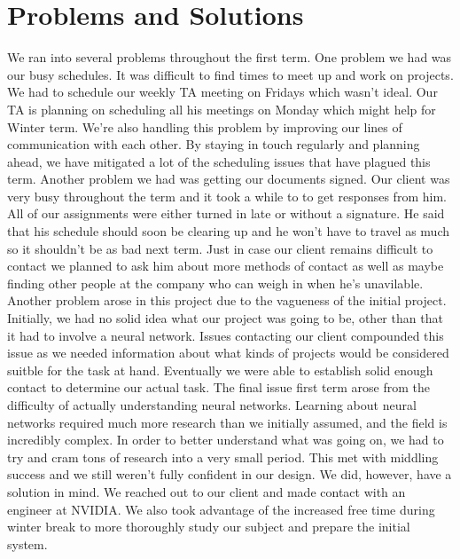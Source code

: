 \documentclass[onecolumn, draftclsnofoot,10pt, compsoc]{IEEEtran}
\begin{document}
\section{Problems and Solutions}
We ran into several problems throughout the first term.
One problem we had was our busy schedules.
It was difficult to find times to meet up and work on projects.
We had to schedule our weekly TA meeting on Fridays which wasn't ideal.
Our TA is planning on scheduling all his meetings on Monday which might help for Winter term.
We're also handling this problem by improving our lines of communication with each other.
By staying in touch regularly and planning ahead, we have mitigated a lot of the scheduling issues that have plagued this term.
\newline\newline
Another problem we had was getting our documents signed.
Our client was very busy throughout the term and it took a while to to get responses from him.
All of our assignments were either turned in late or without a signature.
He said that his schedule should soon be clearing up and he won't have to travel as much so it shouldn't be as bad next term.
Just in case our client remains difficult to contact we planned to ask him about more methods of contact as well as maybe finding other people at the company who can weigh in when he's unavilable.
\newline\newline
Another problem arose in this project due to the vagueness of the initial project.
Initially, we had no solid idea what our project was going to be, other than that it had to involve a neural network.
Issues contacting our client compounded this issue as we needed information about what kinds of projects would be considered suitble for the task at hand.
Eventually we were able to establish solid enough contact to determine our actual task.
\newline\newline
The final issue first term arose from the difficulty of actually understanding neural networks.
Learning about neural networks required much more research than we initially assumed, and the field is incredibly complex.
In order to better understand what was going on, we had to try and cram tons of research into a very small period.
This met with middling success and we still weren't fully confident in our design.
We did, however, have a solution in mind.
We reached out to our client and made contact with an engineer at NVIDIA.
We also took advantage of the increased free time during winter break to more thoroughly study our subject and prepare the initial system.
\end{document}
